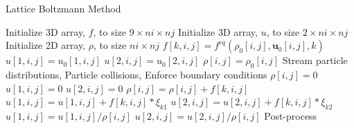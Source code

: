 \begin{algorithm}
\caption{Lattice Boltzmann Method} \label{algo:lbm}
\begin{algorithmic}[1]
   
\Statex {}
\State Initialize 3D array, $f$, to size $9 \times ni \times nj$
\State Initialize 3D array, $u$, to size $2 \times ni \times nj$
\State Initialize 2D array, $\rho$, to size $ni \times nj$
 
      \State $f[k, i, j] = f^{eq}(\rho_0[i, j], \mathbf{u}_0[i, j], k)$ 
    \EndFor
    \State $u[1, i, j] = u_0[1, i, j]$ 
    \State $u[2, i, j] = u_0[2, i, j]$
    \State $\rho[i, j] = \rho_0[i, j]$
  \EndIf
\EndFor
\Statex {}
  \State Stream particle distributions, 
  \State Particle collisions, 
  \State Enforce boundary conditions
  \Statex {}
      \State $\rho[i, j] = 0$
      \State $u[1, i, j] = 0$
      \State $u[2, i, j] = 0$
        \State $\rho[i, j] = \rho[i, j] + f[k, i, j]$
        \State $u[1, i, j] = u[1, i, j] + f[k, i, j] * \xi_{k1}$
        \State $u[2, i, j] = u[2, i, j] + f[k, i, j] * \xi_{k2}$
      \EndFor
        \State $u[1, i, j] = u[1, i, j] / \rho[i, j]$
        \State $u[2, i, j] = u[2, i, j] / \rho[i, j]$
      \EndIf
    \EndIf
  \EndFor
\EndFor
\Statex
\State Post-process
\EndProcedure
\end{algorithmic}
\end{algorithm}
